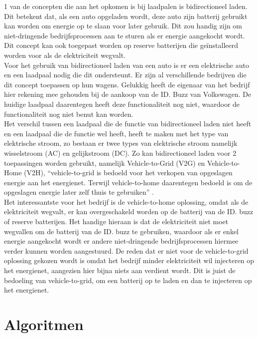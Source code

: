 1 van de concepten die aan het opkomen is bij laadpalen is bidirectioneel laden. Dit betekent dat, als een auto opgeladen wordt, deze auto zijn batterij gebruikt kan worden om energie op te slaan voor later gebruik. Dit zou handig zijn om niet-dringende bedrijfsprocessen aan te sturen als er energie aangekocht wordt. Dit concept kan ook toegepast worden op reserve batterijen die geïnstalleerd worden voor als de elektriciteit wegvalt.\\

Voor het gebruik van bidirectioneel laden van een auto is er een elektrische auto en een laadpaal nodig die dit ondersteunt. Er zijn al verschillende bedrijven die dit concept toepassen op hun wagens. Gelukkig heeft de eigenaar van het bedrijf hier rekening mee gehouden bij de aankoop van de ID. Buzz van Volkswagen. De huidige laadpaal daarentegen heeft deze functionaliteit nog niet, waardoor de functionaliteit nog niet benut kan worden.\\

Het verschil tussen een laadpaal die de functie van bidirectioneel laden niet heeft en een laadpaal die de functie wel heeft, heeft te maken met het type van elektrische stroom, zo bestaan er twee types van elektrische stroom namelijk wisselstroom (AC) en gelijkstroom (DC). Zo kan bidirectioneel laden voor 2 toepassingen worden gebruikt, namelijk Vehicle-to-Grid (V2G) en Vehicle-to-Home (V2H), “vehicle-to-grid is bedoeld voor het verkopen van opgeslagen energie aan het energienet. Terwijl vehicle-to-home daarentegen bedoeld is om de opgeslagen energie later zelf thuis te gebruiken” \autocite{LAZZERONI2019}.\\

Het interessantste voor het bedrijf is de vehicle-to-home oplossing, omdat als de elektriciteit wegvalt, er kan overgeschakeld worden op de batterij van de ID. buzz of reserve batterijen. Het handige hieraan is dat de elektriciteit niet moet wegvallen om de batterij van de ID. buzz te gebruiken, waardoor als er enkel energie aangekocht wordt er andere niet-dringende bedrijfsprocessen hiermee verder kunnen worden aangestuurd. De reden dat er niet voor de vehicle-to-grid oplossing gekozen wordt is omdat het bedrijf minder elektriciteit wil injecteren op het energienet, aangezien hier bijna niets aan verdient wordt. Dit is juist de bedoeling van vehicle-to-grid, om een batterij op te laden en dan te injecteren op het energienet.

\section{Algoritmen}
\label{sec:stand-van-zaken-algoritmen}

